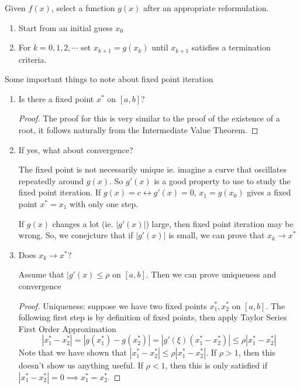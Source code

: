 \documentclass[12pt]{scrartcl}
\begin{document}
\begin{definition}
  Given $f(x)$, select a function $g(x)$ after an appropriate reformulation.

  \begin{enumerate}
    \item Start from an initial guess $x_0$
    \item For $k = 0, 1, 2, \cdots$ set $x_{k+1} = g(x_k)$ until $x_{k+1}$ satisfies a termination criteria.
  \end{enumerate}
\end{definition}

\begin{note}
  Some important things to note about fixed point iteration

  \begin{enumerate}
    \item Is there a fixed point $x^*$ on $[a,b]$?
    
    \begin{proof}
      The proof for this is very similar to the proof of the existence of a root, it follows 
      naturally from the Intermediate Value Theorem. 
    \end{proof}
    \item If yes, what about convergence?
    
    The fixed point is not necessarily unique ie. imagine a curve that oscillates repeatedly around $g(x)$. 
    So $g'(x)$ is a good property to use to study the fixed point iteration. If $g(x) = c \longleftrightarrow g'(x) = 0$, 
    $x_1 = g(x_0)$ gives a fixed point $x^* = x_1$ with only one step.

    If $g(x)$ changes a lot (ie. $|g'(x)|$) large, then fixed point iteration may be wrong. 
    So, we conejcture that if $|g'(x)|$ is small, we can prove that $x_k \to x^*$
    
    \item Does $x_k \to x^*$?

      Assume that $|g'(x) \leq \rho$ on $[a,b]$. Then we can prove uniqueness and convergence  

      \begin{proof}
        
        Uniqueness: suppose we have two fixed points $x_1^*, x_2^*$ on $[a,b]$. The following 
        first step is by definition of fixed points, then apply Taylor Series First Order Approximation
        \[|x_1^* - x_2^*| = |g(x_1^*) - g(x_2^*)| = |g'(\xi)(x_1^* - x_2^*)| \leq \rho|x_1^* - x_2^*|\]
        Note that we have shown that $|x_1^* - x_2^*| \leq \rho |x_1^* - x_2^*|$. If $\rho > 1$, then this doesn't show 
        us anything useful. If $\rho < 1$, then this is only satisfied if $|x_1^* - x_2^*| = 0 \implies x_1^* = x_2^*$.


\end{proof}
\end{enumerate}
\end{note}
\end{document}

